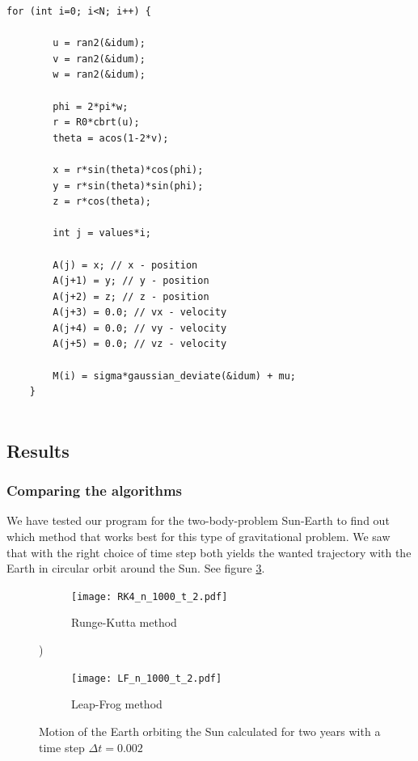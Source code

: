 \documentclass[a4paper,12pt, english]{article}
\begin{document}
\begin{lstlisting}[title={Initial conditions for the N-body system}]
    for (int i=0; i<N; i++) {

        u = ran2(&idum);
        v = ran2(&idum);
        w = ran2(&idum);

        phi = 2*pi*w;
        r = R0*cbrt(u);
        theta = acos(1-2*v);

        x = r*sin(theta)*cos(phi);
        y = r*sin(theta)*sin(phi);
        z = r*cos(theta);

        int j = values*i;

        A(j) = x; // x - position
        A(j+1) = y; // y - position
        A(j+2) = z; // z - position
        A(j+3) = 0.0; // vx - velocity
        A(j+4) = 0.0; // vy - velocity
        A(j+5) = 0.0; // vz - velocity

        M(i) = sigma*gaussian_deviate(&idum) + mu;
    }
  
\end{lstlisting}

 
\subsection*{Results}

\subsubsection*{Comparing the algorithms}

We have tested our program for the two-body-problem Sun-Earth to find out which method that works best for this type of gravitational problem. We saw that with the right choice of time step both yields the wanted trajectory with the Earth in circular orbit around the Sun. See figure \ref{dt_0.002}.

\begin{figure}[H]
        \centering
        \begin{subfigure}[b]{0.6\textwidth}
                \texttt{[image: RK4\_n\_1000\_t\_2.pdf]}
                \caption{Runge-Kutta method}
                \label{fig:RK4_dt_0.002}
        \end{subfigure}%
 )
        \begin{subfigure}[b]{0.6\textwidth}
                \texttt{[image: LF\_n\_1000\_t\_2.pdf]}
                \caption{Leap-Frog method}
                \label{fig:LF_dt_0.002}
        \end{subfigure}
        \caption{Motion of the Earth orbiting the Sun calculated for two years with a time step $\Delta t = 0.002$}
\label{dt_0.002}
\end{figure}
\end{document}

